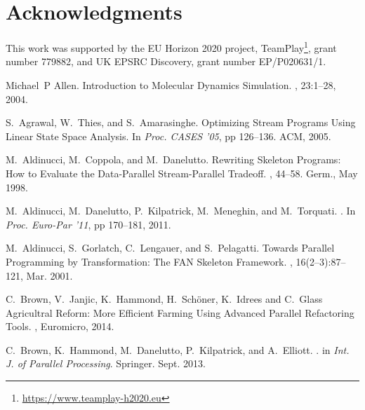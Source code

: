\documentclass[smallextended]{svjour3}
\begin{document}
\section*{Acknowledgments}
This work was supported by the EU Horizon 2020 project, TeamPlay\footnote{\url{https://www.teamplay-h2020.eu}}, grant number 779882, and UK EPSRC Discovery, grant number EP/P020631/1.





\begin{thebibliography}{}
Michael~P Allen.
\newblock Introduction to Molecular Dynamics Simulation.
,
  23:1--28, 2004.

S.~Agrawal, W.~Thies, and S.~Amarasinghe.
\newblock Optimizing Stream Programs Using Linear State Space Analysis.
\newblock In {\em Proc. CASES '05}, pp 126--136.
  ACM, 2005.

M.~Aldinucci, M.~Coppola, and M.~Danelutto.
\newblock Rewriting {S}keleton {P}rograms: {H}ow to {E}valuate the
  {D}ata-{P}arallel {S}tream-{P}arallel {T}radeoff.
, 44--58. Germ., May 1998.

M.~Aldinucci, M.~Danelutto, P.~Kilpatrick, M.~Meneghin, and M.~Torquati.
.
\newblock In {\em Proc. Euro-Par '11}, pp 170--181, 2011.

M.~Aldinucci, S.~Gorlatch, C.~Lengauer, and S.~Pelagatti.
\newblock Towards {P}arallel {P}rogramming by {T}ransformation: {T}he {FAN}
  {S}keleton {F}ramework.
, 16(2--3):87--121, Mar.
  2001.

C.~Brown, V.~Janjic, K.~Hammond, H.~Sch\"oner, K.~Idrees and C.~Glass
\newblock Agricultral Reform: More Efficient Farming Using Advanced Parallel Refactoring Tools.
, Euromicro, 2014.

C.~Brown, K.~Hammond, M.~Danelutto, P.~Kilpatrick, and A.~Elliott.
.
\newblock in {\em Int. J. of Parallel Processing}. Springer. Sept. 2013.


\end{thebibliography}
\end{document}
